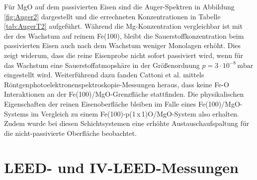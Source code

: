 Für MgO auf dem passivierten Eisen sind die Auger-Spektren in Abbildung \ref{fig:Auger2} dargestellt und die errechneten Konzentrationen 
in Tabelle \ref{tab:AugerT2} aufgeführt. Während die Mg-Konzentration vergleichbar ist mit der des Wachstum auf reinem Fe(100),
bleibt die Sauerstoffkonzentration beim passivierten Eisen auch nach dem Wachstum weniger Monolagen erhöht. 
Dies zeigt widerum, dass die reine Eisenprobe nicht
sofort passiviert wird, wenn für das Wachstum eine Sauerstoffatmopshäre in der Größenordnung $p=3\cdot 10^{-8}\,\si{\milli\bar}$ eingestellt wird. 
Weiterführend dazu fanden Cattoni et al. \cite{PhysRevB.80.104437} mittels Röntgenphotoelektronenspektroskopie-Messungen heraus, dass keine Fe-O Interaktionen an der Fe(100)/MgO-Grenzfläche 
stattfinden. Die physikalischen Eigenschaften der reinen Eisenoberfläche bleiben im Falle eines 
Fe(100)/MgO-Systems im Vergleich zu einem Fe(100)-p(1\,x\,1)O/MgO-System also erhalten. Zudem wurde bei diesen Schichtsystemen 
eine erhöhte Austauschaufspaltung für die nicht-passivierte Oberfläche beobachtet.


\section{LEED- und IV-LEED-Messungen}


